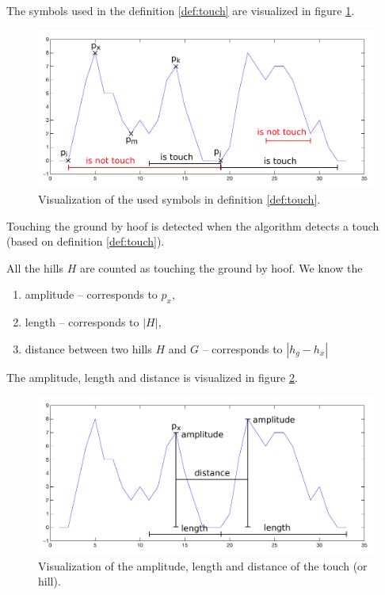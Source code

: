 \begin{remark}
    The symbols used in the definition \ref{def:touch} are visualized in figure \ref{fig:touchDefinition}.
\end{remark}

\begin{figure}
    \centering
    \caption{Visualization of the used symbols in definition \ref{def:touch}.}
    \label{fig:touchDefinition}
    \includegraphics[width=\linewidth]{img/touchHillDefinition.pdf}
\end{figure}

Touching the ground by hoof is detected when the algorithm detects a touch (based on definition \ref{def:touch}).

All the hills $H$ are counted as touching the ground by hoof. We know the
\begin{enumerate}
    \item amplitude -- corresponds to $p_x$,
    \item length -- corresponds to $|H|$,
    \item distance between two hills $H$ and $G$ -- corresponds to $|h_g - h_x|$
\end{enumerate}
The amplitude, length and distance is visualized in figure \ref{fig:touchProperties}.

\begin{figure}
    \centering
    \caption{Visualization of the amplitude, length and distance of the touch (or hill).}
    \label{fig:touchProperties}
    \includegraphics[width=\linewidth]{img/touchHillProperties.pdf}
\end{figure}

